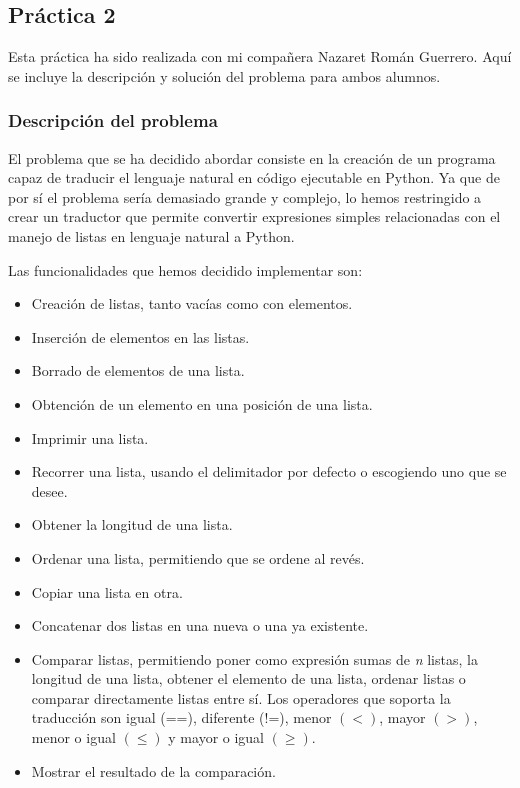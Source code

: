 \documentclass[11pt,a4paper]{article}
\begin{document}
	
	\newpage
	\subsection{Práctica 2}
		Esta práctica ha sido realizada con mi compañera Nazaret Román Guerrero. Aquí se incluye la descripción y
		solución del problema para ambos alumnos. \par
		
		\subsubsection{Descripción del problema}
		El problema que se ha decidido abordar consiste en la creación de un programa capaz de traducir el lenguaje
		natural en código ejecutable en Python. Ya que de por sí el problema sería demasiado grande y complejo, lo
		hemos restringido a crear un traductor que permite convertir expresiones simples relacionadas con el manejo de
		listas en lenguaje natural a Python. \par
		Las funcionalidades que hemos decidido implementar son:
		\begin{itemize}
			\item Creación de listas, tanto vacías como con elementos.
			\item Inserción de elementos en las listas.
			\item Borrado de elementos de una lista.
			\item Obtención de un elemento en una posición de una lista.
			\item Imprimir una lista.
			\item Recorrer una lista, usando el delimitador por defecto o escogiendo uno que se desee.
			\item Obtener la longitud de una lista.
			\item Ordenar una lista, permitiendo que se ordene al revés.
			\item Copiar una lista en otra.
			\item Concatenar dos listas en una nueva o una ya existente.
			\item Comparar listas, permitiendo poner como expresión sumas de \textit{n} listas, la longitud de una
			lista, 	obtener el elemento de una lista, ordenar listas o comparar directamente listas entre sí. Los
			operadores que soporta la traducción son igual (==), diferente (!=), menor $(<)$, mayor $(>)$,
			menor o igual $(\leq)$ y mayor o igual $(\geq)$.
			\item Mostrar el resultado de la comparación.
		\end{itemize}
		
\end{document}
